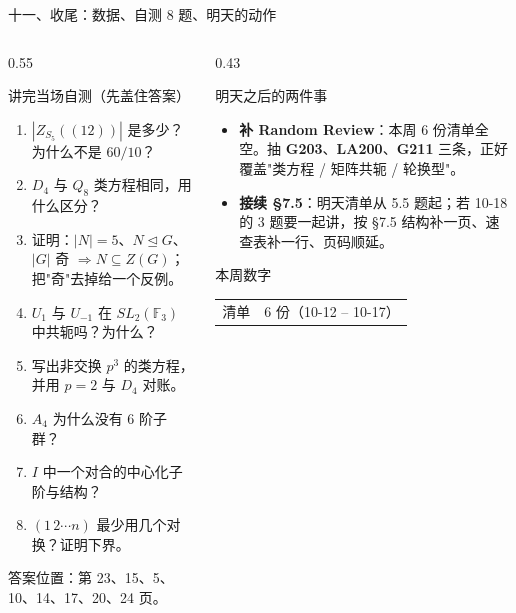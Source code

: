 \documentclass[aspectratio=169,10pt,fontset=none]{ctexbeamer}
\newcommand{\ex}[1]{\textcolor{accent}{\footnotesize\bfseries #1}}
\begin{document}
\begin{frame}[t]{十一、收尾：数据、自测 8 题、明天的动作}
  \begin{columns}[T,onlytextwidth]
    \begin{column}{0.55\textwidth}
      \begin{block}{\footnotesize 讲完当场自测（先盖住答案）}
        \scriptsize
        \begin{enumerate}\setlength{\itemsep}{1pt}
          \item $|Z_{S_5}((12))|$ 是多少？为什么不是 $60/10$？
          \item $D_4$ 与 $Q_8$ 类方程相同，用什么区分？
          \item 证明：$|N|=5$、$N\trianglelefteq G$、$|G|$ 奇 $\Rightarrow N\subseteq Z(G)$；把"奇"去掉给一个反例。
          \item $U_1$ 与 $U_{-1}$ 在 $SL_2(\mathbb F_3)$ 中共轭吗？为什么？
          \item 写出非交换 $p^3$ 的类方程，并用 $p=2$ 与 $D_4$ 对账。
          \item $A_4$ 为什么没有 6 阶子群？
          \item $I$ 中一个对合的中心化子阶与结构？
          \item $(1\,2\cdots n)$ 最少用几个对换？证明下界。
        \end{enumerate}
        答案位置：第 23、15、5、10、14、17、20、24 页。
      \end{block}
    \end{column}
    \begin{column}{0.43\textwidth}
      \begin{exampleblock}{\footnotesize 明天之后的两件事}
        \scriptsize
        \begin{itemize}\setlength{\itemsep}{2pt}
          \item \textbf{补 Random Review}：本周 6 份清单全空。抽 \ex{G203}、\ex{LA200}、\ex{G211} 三条，正好覆盖"类方程 / 矩阵共轭 / 轮换型"。
          \item \textbf{接续 \S7.5}：明天清单从 5.5 题起；若 10-18 的 3 题要一起讲，按 \S7.5 结构补一页、速查表补一行、页码顺延。
        \end{itemize}
      \end{exampleblock}
      \begin{block}{\footnotesize 本周数字}
        \scriptsize
        \begin{tabular}{@{}ll@{}}
          清单 & 6 份（10-12 -- 10-17）\\

\end{tabular}
\end{block}
\end{column}
\end{columns}
\end{frame}
\end{document}
